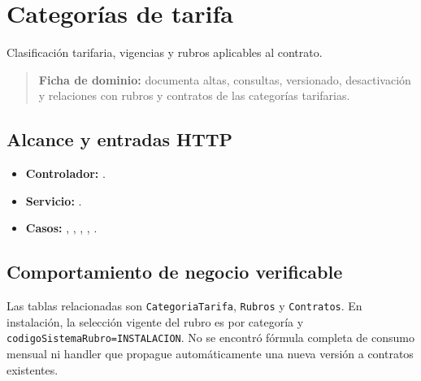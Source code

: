 \section{Categorías de tarifa}


Clasificación tarifaria, vigencias y rubros aplicables al contrato.


\begin{quote}
\textbf{Ficha de dominio:} documenta altas, consultas, versionado, desactivación y relaciones con rubros y contratos de las categorías tarifarias.
\end{quote}


\subsection{Alcance y entradas HTTP}


\begin{itemize}
\item \textbf{Controlador:} \texttt{}.
\item \textbf{Servicio:} \texttt{}.
\item \textbf{Casos:} \texttt{}, \texttt{}, \texttt{}, \texttt{}, \texttt{}.
\end{itemize}

\subsection{Comportamiento de negocio verificable}
Las tablas relacionadas son \texttt{CategoriaTarifa}, \texttt{Rubros} y \texttt{Contratos}. En instalación, la selección vigente del rubro es por categoría y \texttt{codigoSistemaRubro=INSTALACION}. No se encontró fórmula completa de consumo mensual ni handler que propague automáticamente una nueva versión a contratos existentes.


